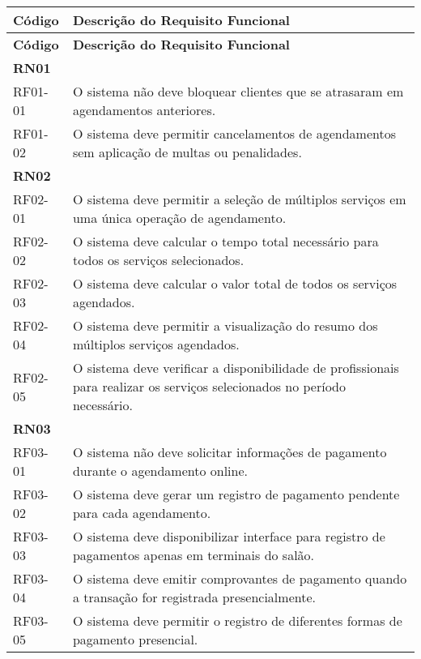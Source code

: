 \begin{longtable}{|p{}|p{}|}
	\hline
	\textbf{Código} & \textbf{Descrição do Requisito Funcional} \\
	\hline
	\endfirsthead
	
	\hline
	\textbf{Código} & \textbf{Descrição do Requisito Funcional} \\
	\hline
	\endhead
	
	\multicolumn{2}{|l|}{\textbf{RN01}} \\ \hline
	RF01-01 & O sistema não deve bloquear clientes que se atrasaram em agendamentos anteriores. \\ \hline
	RF01-02 & O sistema deve permitir cancelamentos de agendamentos sem aplicação de multas ou penalidades. \\ \hline
	
	\multicolumn{2}{|l|}{\textbf{RN02}} \\ \hline
	RF02-01 & O sistema deve permitir a seleção de múltiplos serviços em uma única operação de agendamento. \\ \hline
	RF02-02 & O sistema deve calcular o tempo total necessário para todos os serviços selecionados. \\ \hline
	RF02-03 & O sistema deve calcular o valor total de todos os serviços agendados. \\ \hline
	RF02-04 & O sistema deve permitir a visualização do resumo dos múltiplos serviços agendados. \\ \hline
	RF02-05 & O sistema deve verificar a disponibilidade de profissionais para realizar os serviços selecionados no período necessário. \\ \hline
	
	\multicolumn{2}{|l|}{\textbf{RN03}} \\ \hline
	RF03-01 & O sistema não deve solicitar informações de pagamento durante o agendamento online. \\ \hline
	RF03-02 & O sistema deve gerar um registro de pagamento pendente para cada agendamento. \\ \hline
	RF03-03 & O sistema deve disponibilizar interface para registro de pagamentos apenas em terminais do salão. \\ \hline
	RF03-04 & O sistema deve emitir comprovantes de pagamento quando a transação for registrada presencialmente. \\ \hline
	RF03-05 & O sistema deve permitir o registro de diferentes formas de pagamento presencial. \\ \hline
	

\end{longtable}
